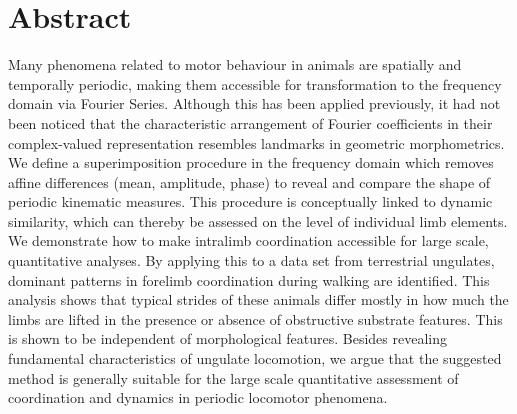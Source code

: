 


\pagebreak
\section{Abstract}
Many phenomena related to motor behaviour in animals are spatially and temporally periodic, making them accessible for transformation to the frequency domain via Fourier Series.
Although this has been applied previously, it had not been noticed that the characteristic arrangement of Fourier coefficients in their complex-valued representation resembles landmarks in geometric morphometrics.
We define a superimposition procedure in the frequency domain which removes affine differences (mean, amplitude, phase) to reveal and compare the shape of periodic kinematic measures.
This procedure is conceptually linked to dynamic similarity, which can thereby be assessed on the level of individual limb elements.
We demonstrate how to make intralimb coordination accessible for large scale, quantitative analyses.
By applying this to a data set from terrestrial ungulates, dominant patterns in forelimb coordination during walking are identified.
This analysis shows that typical strides of these animals differ mostly in how much the limbs are lifted in the presence or absence of obstructive substrate features.
This is shown to be independent of morphological features.
Besides revealing fundamental characteristics of ungulate locomotion, we argue that the suggested method is generally suitable for the large scale quantitative assessment of coordination and dynamics in periodic locomotor phenomena.


\pagebreak
